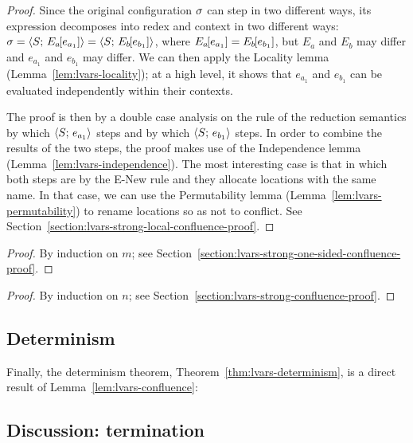 \LVarsLemStrongLocalConfluence
\begin{proof}
  Since the original configuration $\sigma$ can step in two different
  ways, its expression decomposes into redex and context in two
  different ways: $\sigma = \langle S;\, E_a\hspace{-1mm}\left[e_{a_1}\right] \rangle =
  \langle S;\, E_b\hspace{-1mm}\left[e_{b_1}\right] \rangle$, where $E_a\hspace{-1mm}\left[e_{a_1}\right]
  = E_b\hspace{-1mm}\left[e_{b_1}\right]$, but $E_a$ and $E_b$ may differ and
  $e_{a_1}$ and $e_{b_1}$ may differ.  We can then apply the Locality
  lemma (Lemma~\ref{lem:lvars-locality}); at a high level, it shows
  that $e_{a_1}$ and $e_{b_1}$ can be evaluated independently within
  their contexts.

  The proof is then by a double case analysis on the rule of the
  reduction semantics by which $\langle S;\, e_{a_1} \rangle$ steps and by
  which $\langle S;\, e_{b_1} \rangle$ steps.  In order to combine the results
  of the two steps, the proof makes use of the Independence lemma
  (Lemma~\ref{lem:lvars-independence}).  The most interesting case is
  that in which both steps are by the {\sc E-New} rule and they
  allocate locations with the same name.  In that case, we can use the
  Permutability lemma (Lemma~\ref{lem:lvars-permutability}) to rename
  locations so as not to conflict.  See
  Section~\ref{section:lvars-strong-local-confluence-proof}.
\end{proof}

\LVarsLemStrongOneSidedConfluence
\begin{proof}
  By induction on $m$; see
  Section~\ref{section:lvars-strong-one-sided-confluence-proof}.
\end{proof}

\LVarsLemStrongConfluence
\begin{proof}
  By induction on $n$; see
  Section~\ref{section:lvars-strong-confluence-proof}.
\end{proof}

\LVarsLemConfluence

\subsection{Determinism}

Finally, the determinism theorem, Theorem~\ref{thm:lvars-determinism},
is a direct result of Lemma~\ref{lem:lvars-confluence}:

\LVarsThmDeterminism

\subsection{Discussion: termination}

